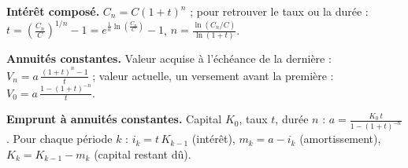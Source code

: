 \smallskip
\noindent
\textbf{Intérêt composé.} $C_{n} = C(1+t)^{n}$ ; pour retrouver le taux ou
la durée : $\displaystyle t = \left(\frac{C_{n}}{C}\right)^{1/n}-1
= e^{\frac1n\ln\left(\frac{C_{n}}{C}\right)}-1$, \quad
$\displaystyle n = \frac{\ln\left(C_{n}/C\right)}{\ln(1+t)}$.

\smallskip
\noindent
\textbf{Annuités constantes.} Valeur acquise à l'échéance de la dernière :
$\displaystyle V_{n} = a\,\frac{(1+t)^{n}-1}{t}$ ; valeur actuelle, un
versement avant la première :
$\displaystyle V_{0} = a\,\frac{1-(1+t)^{-n}}{t}$.

\smallskip
\noindent
\textbf{Emprunt à annuités constantes.} Capital $K_{0}$, taux $t$, durée
$n$ : $\displaystyle a = \frac{K_{0}\,t}{1-(1+t)^{-n}}$. Pour chaque
période $k$ : $i_{k} = t\,K_{k-1}$ (intérêt), $m_{k} = a-i_{k}$
(amortissement), $K_{k} = K_{k-1}-m_{k}$ (capital restant dû).
